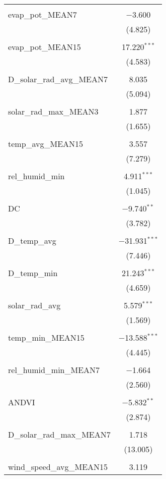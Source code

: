 \begin{table}[!htbp]
\begin{tabular}{@{\extracolsep{5pt}}lc}
  & \\ 
 evap\_pot\_MEAN7 & $-$3.600 \\ 
  & (4.825) \\ 
  & \\ 
 evap\_pot\_MEAN15 & 17.220$^{***}$ \\ 
  & (4.583) \\ 
  & \\ 
 D\_solar\_rad\_avg\_MEAN7 & 8.035 \\ 
  & (5.094) \\ 
  & \\ 
 solar\_rad\_max\_MEAN3 & 1.877 \\ 
  & (1.655) \\ 
  & \\ 
 temp\_avg\_MEAN15 & 3.557 \\ 
  & (7.279) \\ 
  & \\ 
 rel\_humid\_min & 4.911$^{***}$ \\ 
  & (1.045) \\ 
  & \\ 
 DC & $-$9.740$^{**}$ \\ 
  & (3.782) \\ 
  & \\ 
 D\_temp\_avg & $-$31.931$^{***}$ \\ 
  & (7.446) \\ 
  & \\ 
 D\_temp\_min & 21.243$^{***}$ \\ 
  & (4.659) \\ 
  & \\ 
 solar\_rad\_avg & 5.579$^{***}$ \\ 
  & (1.569) \\ 
  & \\ 
 temp\_min\_MEAN15 & $-$13.588$^{***}$ \\ 
  & (4.445) \\ 
  & \\ 
 rel\_humid\_min\_MEAN7 & $-$1.664 \\ 
  & (2.560) \\ 
  & \\ 
 ANDVI & $-$5.832$^{**}$ \\ 
  & (2.874) \\ 
  & \\ 
 D\_solar\_rad\_max\_MEAN7 & 1.718 \\ 
  & (13.005) \\ 
  & \\ 
 wind\_speed\_avg\_MEAN15 & 3.119 \\ 

\end{tabular}
\end{table}
